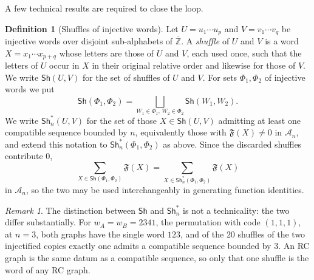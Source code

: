 \documentclass{amsart}
\theoremstyle{definition}
\newtheorem{definition}[lemma]{Definition}
\theoremstyle{remark}
\newtheorem*{remark}{Remark}
\numberwithin{equation}{subsection}
\newcommand{\wof}[1]{w_{#1}}
\newcommand{\coma}{\mathcal{A}}
\begin{document}
A few technical results are required to close the loop.

\begin{definition}[Shuffles of injective words]\label{definition:shuffle}
Let $U=u_1\cdots u_p$ and $V=v_1\cdots v_q$ be injective words over disjoint sub-alphabets of $\overline{\mathbb{Z}}$. A \emph{shuffle} of $U$ and $V$ is a word $X=x_1\cdots x_{p+q}$ whose letters are those of $U$ and $V$, each used once, such that the letters of $U$ occur in $X$ in their original relative order and likewise for those of $V$. We write $\mathsf{Sh}(U,V)$ for the set of shuffles of $U$ and $V$. For sets $\Phi_1,\Phi_2$ of injective words we put
$$\mathsf{Sh}(\Phi_1,\Phi_2)=\bigsqcup_{W_1\in\Phi_1,\,W_2\in\Phi_2}\mathsf{Sh}(W_1,W_2).$$
We write $\mathsf{Sh}^{*}_n(U,V)$ for the set of those $X\in\mathsf{Sh}(U,V)$ admitting at least one compatible sequence bounded by $n$, equivalently those with $\mathfrak{F}(X)\neq 0$ in $\coma_n$, and extend this notation to $\mathsf{Sh}^{*}_n(\Phi_1,\Phi_2)$ as above. Since the discarded shuffles contribute $0$,
$$\sum_{X\in\mathsf{Sh}(\Phi_1,\Phi_2)}\mathfrak{F}(X)=\sum_{X\in\mathsf{Sh}^{*}_n(\Phi_1,\Phi_2)}\mathfrak{F}(X)$$
in $\coma_n$, so the two may be used interchangeably in generating function identities.
\end{definition}

\begin{remark}
The distinction between $\mathsf{Sh}$ and $\mathsf{Sh}^{*}_n$ is not a technicality: the two differ substantially. For $\wof A=\wof B=2341$, the permutation with code $(1,1,1)$, at $n=3$, both graphs have the single word $123$, and of the $20$ shuffles of the two injectified copies exactly one admits a compatible sequence bounded by $3$. An RC graph is the same datum as a compatible sequence, so only that one shuffle is the word of any RC graph.
\end{remark}
\end{document}
